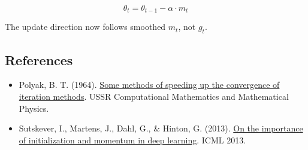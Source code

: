\[
\theta_t = \theta_{t-1} - \alpha \cdot m_t
\]

The update direction now follows smoothed \(m_t\), not \(g_t\).

\FloatBarrier
{}
\hypertarget{references-26}{%
\subsection{References}\label{references-26}}

\vspace{0.25em}
\begin{itemize}
\tightlist
\item
  Polyak, B. T. (1964). \href{https://doi.org/10.1016/0041-5553(64)90137-5}{Some methods of speeding up the convergence of iteration methods}. USSR Computational Mathematics and Mathematical Physics.
\item
  Sutskever, I., Martens, J., Dahl, G., \& Hinton, G. (2013). \href{https://proceedings.mlr.press/v28/sutskever13.html}{On the importance of initialization and momentum in deep learning}. ICML 2013.
\end{itemize}

\clearpage
